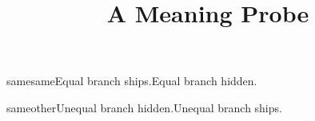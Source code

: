 \documentclass{article}
\title{A Meaning Probe}
\date{}
\newcommand{\probeone}{same}
\newcommand{\probetwo}{same}
\newcommand{\probethree}{other}
\begin{document}
\maketitle
\ifx\probeone\probetwo Equal branch ships.\else Equal branch hidden.\fi

\ifx\probeone\probethree Unequal branch hidden.\else Unequal branch ships.\fi
\end{document}
